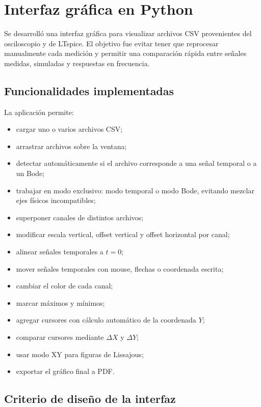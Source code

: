 \section{Interfaz gráfica en Python}

Se desarrolló una interfaz gráfica para visualizar archivos CSV provenientes del osciloscopio y de LTspice. El objetivo fue evitar tener que reprocesar manualmente cada medición y permitir una comparación rápida entre señales medidas, simuladas y respuestas en frecuencia.

\subsection{Funcionalidades implementadas}

La aplicación permite:

\begin{itemize}[itemsep=0.2em]
    \item cargar uno o varios archivos CSV;
    \item arrastrar archivos sobre la ventana;
    \item detectar automáticamente si el archivo corresponde a una señal temporal o a un Bode;
    \item trabajar en modo exclusivo: modo temporal o modo Bode, evitando mezclar ejes físicos incompatibles;
    \item superponer canales de distintos archivos;
    \item modificar escala vertical, offset vertical y offset horizontal por canal;
    \item alinear señales temporales a $t=0$;
    \item mover señales temporales con mouse, flechas o coordenada escrita;
    \item cambiar el color de cada canal;
    \item marcar máximos y mínimos;
    \item agregar cursores con cálculo automático de la coordenada $Y$;
    \item comparar cursores mediante $\Delta X$ y $\Delta Y$;
    \item usar modo XY para figuras de Lissajous;
    \item exportar el gráfico final a PDF.
\end{itemize}

\subsection{Criterio de diseño de la interfaz}

